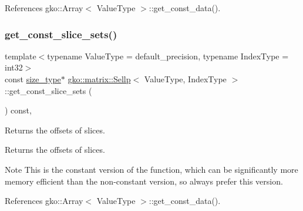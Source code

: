 References gko\+::\+Array$<$ Value\+Type $>$\+::get\+\_\+const\+\_\+data().

\mbox{\label{classgko_1_1matrix_1_1Sellp_a1b5bcac41afe4dee75994ad05c1ffc81}} 
\subsubsection{\texorpdfstring{get\+\_\+const\+\_\+slice\+\_\+sets()}{get\_const\_slice\_sets()}}
{\footnotesize\ttfamily template$<$typename Value\+Type = default\+\_\+precision, typename Index\+Type = int32$>$ \\
const \hyperlink{namespacegko_a6e5c95df0ae4e47aab2f604a22d98ee7}{size\+\_\+type}$\ast$ \hyperlink{classgko_1_1matrix_1_1Sellp}{gko\+::matrix\+::\+Sellp}$<$ Value\+Type, Index\+Type $>$\+::get\+\_\+const\+\_\+slice\+\_\+sets (\begin{DoxyParamCaption}{ }\end{DoxyParamCaption}) const\hspace{0.3cm}{\ttfamily [inline]}, {\ttfamily [noexcept]}}



Returns the offsets of slices. 

\begin{DoxyReturn}{Returns}
the offsets of slices.
\end{DoxyReturn}
\begin{DoxyNote}{Note}
This is the constant version of the function, which can be significantly more memory efficient than the non-\/constant version, so always prefer this version. 
\end{DoxyNote}


References gko\+::\+Array$<$ Value\+Type $>$\+::get\+\_\+const\+\_\+data().

\mbox{\label{classgko_1_1matrix_1_1Sellp_a8a3c4738049b7e6819806bb51e1a5523}} 
